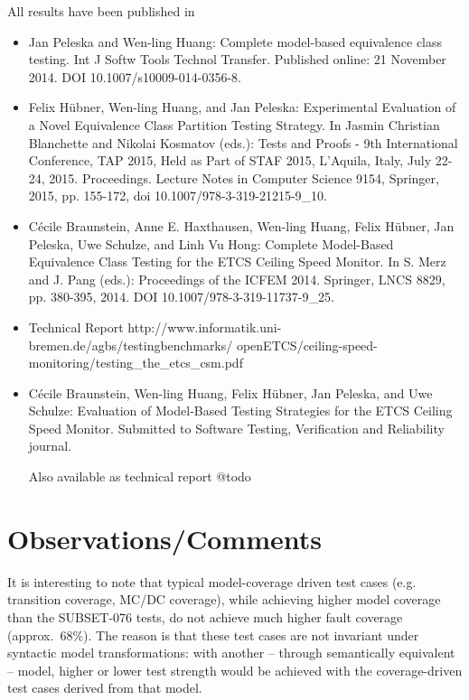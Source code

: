 All   results have been published in 
\begin{itemize}
\item  Jan Peleska and Wen-ling Huang: Complete model-based equivalence class testing. Int J Softw Tools Technol Transfer. Published online: 21 November 2014. DOI 10.1007/s10009-014-0356-8.

\item Felix Hübner, Wen-ling Huang, and Jan Peleska: Experimental Evaluation of a Novel Equivalence Class Partition Testing Strategy. In Jasmin Christian Blanchette and Nikolai Kosmatov (eds.): Tests and Proofs - 9th International Conference, TAP 2015, Held as Part of STAF 2015, L'Aquila, Italy, July 22-24, 2015. Proceedings. Lecture Notes in Computer Science 9154, Springer, 2015, pp. 155-172, doi 10.1007/978-3-319-21215-9\_10.

\item C{\'e}cile Braunstein, Anne E. Haxthausen, Wen-ling Huang, Felix Hübner, Jan Peleska, Uwe Schulze, and Linh Vu Hong: Complete Model-Based Equivalence Class Testing for the ETCS Ceiling Speed Monitor. In S. Merz and J. Pang (eds.): Proceedings of the ICFEM 2014. Springer, LNCS 8829, pp. 380-395, 2014. DOI 10.1007/978-3-319-11737-9\_25.


\item Technical Report http://www.informatik.uni-bremen.de/agbs/testingbenchmarks/
\newline
openETCS/ceiling-speed-monitoring/testing\_the\_etcs\_csm.pdf






\item C{\'e}cile Braunstein,   Wen-ling Huang, Felix Hübner, Jan Peleska, and Uwe Schulze: Evaluation of Model-Based Testing Strategies for the ETCS Ceiling Speed Monitor.
Submitted to Software Testing, Verification and Reliability journal.

Also available as technical report @todo
\end{itemize}






\section{Observations/Comments}

It is interesting to note that typical model-coverage driven test cases (e.g. transition coverage, MC/DC coverage), while achieving higher model coverage than the
SUBSET-076 tests, do not achieve much higher fault coverage (approx.~68\%). 
The reason is that   these test cases are not invariant under syntactic model transformations: with another -- through semantically equivalent -- model, higher or lower test strength would be achieved with the coverage-driven test cases derived
from that model. 

